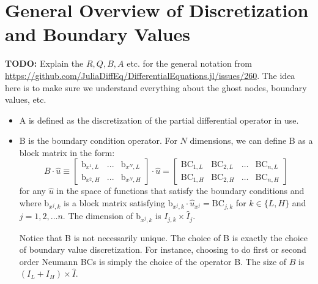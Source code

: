 \documentclass[11pt]{article}
\begin{document}
	\section{General Overview of Discretization and Boundary Values}\label{sec:general}
	\textbf{TODO:} Explain the $R, Q, B, A$ etc. for the general notation from \url{https://github.com/JuliaDiffEq/DifferentialEquations.jl/issues/260}.  The idea here is to make sure we understand everything about the ghost nodes, boundary values, etc.
	\begin{itemize}
		\item A is defined as the discretization of the partial differential operator in use.
		
		\item B is the boundary condition operator. For $N$ dimensions, we can define B as a block matrix in the form:
		\begin{equation}
		B\cdot \hat{u} \equiv \begin{bmatrix}
		\text{b}_{x^{1},L} & ... & \text{b}_{x^{N},L}\\
		\text{b}_{x^{2},H} & ... & \text{b}_{x^{N},H}
		\end{bmatrix}\cdot\hat{u} = \begin{bmatrix}
		\text{BC}_{1, L}&\text{BC}_{2, L}&\dots&\text{BC}_{n, L}\\
		\text{BC}_{1, H}&\text{BC}_{2, H}&\dots&\text{BC}_{n, H}
		\end{bmatrix}\label{B_operator_block}
		\end{equation}
		for any $\hat{u}$ in the space of functions that satisfy the boundary conditions and where b$_{x^j,k}$ is a block matrix satisfying b$_{x^j,k}\cdot \hat{u}_{x^j} = \text{BC}_{j,k}$ for $k \in \{L,H\}$ and $j = 1, 2,\dots n$. The dimension of b$_{x^j,k}$ is $I_{j,k} \times \hat{I}_j$. 
		
		Notice that B is not necessarily unique. The choice of B is exactly the choice of boundary value discretization. For instance, choosing to do first or second order Neumann BCs is simply the choice of the operator B. The size of $B$ is $(I_L + I_H) \times \hat{I}$.
		

\end{itemize}
\end{document}
